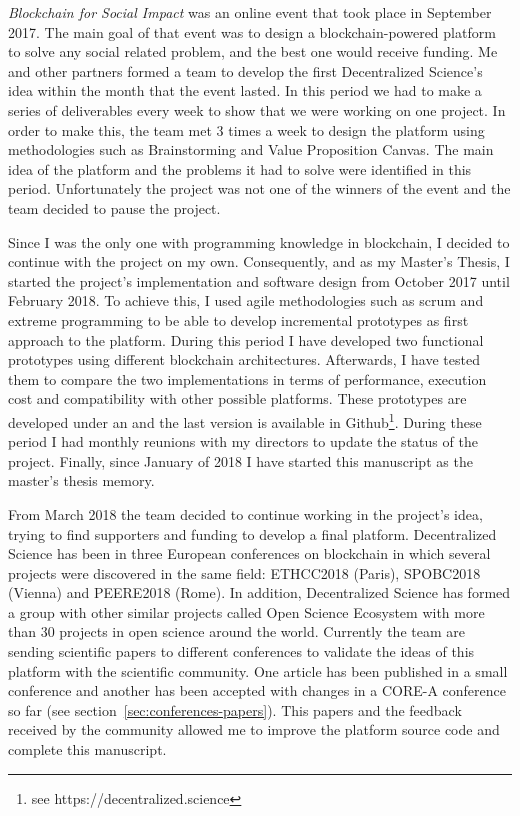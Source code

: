 \begin{itemize}
   \emph{Blockchain for Social Impact} was an online event
  that took place in September 2017. The main goal of that event was to design a
  blockchain-powered platform to solve any social related problem, and the best
  one would receive funding. Me and other partners formed a team to develop the
  first Decentralized Science's idea within the month that the event lasted. In
  this period we had to make a series of deliverables every week to show that we
  were working on one project. In order to make this, the team met 3 times a
  week to design the platform using methodologies such as Brainstorming and
  Value Proposition Canvas. The main idea of the platform and the problems it
  had to solve were identified in this period. Unfortunately the project was not
  one of the winners of the event and the team decided to pause the project.

   Since I was the only one with programming
  knowledge in blockchain, I decided to continue with the project on my own.
  Consequently, and as my Master's Thesis, I started the project's
  implementation and software design from October 2017 until February 2018. To
  achieve this, I used agile methodologies such as scrum and extreme programming
  to be able to develop incremental prototypes as first approach to the
  platform. During this period I have developed two functional prototypes using
  different blockchain architectures. Afterwards, I have tested them to compare
  the two implementations in terms of performance, execution cost and
  compatibility with other possible platforms. These prototypes are developed
  under an  and the last version is available in
  Github\footnote{see https://decentralized.science}. During these period I had
  monthly reunions with my directors to update the status of the project.
  Finally, since January of 2018 I have started this manuscript as the master's
  thesis memory.

   From March 2018 the team decided to continue working in
  the project's idea, trying to find supporters and funding to develop a final
  platform. Decentralized Science has been in three European conferences on
  blockchain in which several projects were discovered in the same field:
  ETHCC2018 (Paris), SPOBC2018 (Vienna) and PEERE2018 (Rome). In addition,
  Decentralized Science has formed a group with other similar projects called
  Open Science Ecosystem with more than 30 projects in open science around the
  world. Currently the team are sending scientific papers to different
  conferences to validate the ideas of this platform with the scientific
  community. One article has been published in a small conference and another
  has been accepted with changes in a CORE-A conference so far (see
  section~\ref{sec:conferences-papers}). This papers and the feedback received
  by the community allowed me to improve the platform source code and complete
  this manuscript.
  
\end{itemize}

